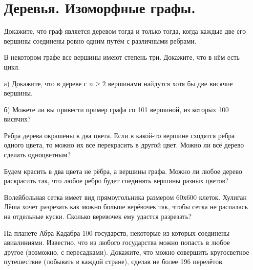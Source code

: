 
\section{Деревья. Изоморфные графы.}

\begin{thm}
    Докажите, что граф является деревом тогда и только тогда, когда каждые две его вершины соединены ровно одним путём с различными ребрами.
\end{thm}

\begin{thm}
    В некотором графе все вершины имеют степень три. Докажите, что в нём есть цикл.
\end{thm}

\begin{thm}
    а) Докажите, что в дереве с $n \geq 2$ вершинами найдутся хотя бы две висячие вершины. 
    \par б) Можете ли вы привести пример графа со 101 вершиной, из которых 100 висячих?
\end{thm}

\begin{thm}
    Ребра дерева окрашены в два цвета. Если в какой-то вершине сходятся ребра одного цвета, то можно их все перекрасить в другой цвет. Можно ли всё дерево сделать одноцветным?
\end{thm}

\begin{thm}
    Будем красить в два цвета не рёбра, а вершины графа. Можно ли любое дерево раскрасить так, что любое ребро будет соединять вершины разных цветов?
\end{thm}

\begin{thm}
    Волейбольная сетка имеет вид прямоугольника размером 60х600 клеток. Хулиган Лёша хочет разрезать как можно больше верёвочек так, чтобы сетка не распалась на отдельные куски. Сколько веревочек ему удастся разрезать?
\end{thm}

\begin{thm}
    На планете Абра-Кадабра 100 государств, некоторые из которых соединены авиалиниями. Известно, что из любого государства можно попасть в любое другое (возможно, с пересадками). Докажите, что можно совершить кругосветное путешествие (побывать в каждой стране), сделав не более 196 перелётов.
\end{thm}

